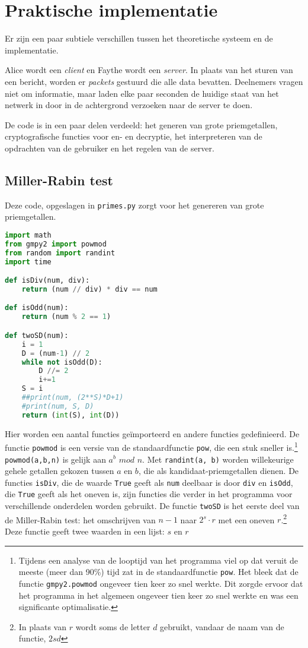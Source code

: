 \documentclass{report} %
\let\code\lstinline
\begin{document}
\section{Praktische implementatie}
Er zijn een paar subtiele verschillen tussen het theoretische systeem en de implementatie. 
\par Alice wordt een \textit{client} en Faythe wordt een \textit{server}. In plaats van het sturen van een bericht, worden er \textit{packets} gestuurd die alle data bevatten. Deelnemers vragen niet om informatie, maar laden elke paar seconden de huidige staat van het netwerk in door in de achtergrond verzoeken naar de server te doen.
\par De code is in een paar delen verdeeld: het generen van grote priemgetallen, cryptografische functies voor en- en decryptie, het interpreteren van de opdrachten van de gebruiker en het regelen van de server. 

\subsection{Miller-Rabin test}
Deze code, opgeslagen in \code{primes.py} zorgt voor het genereren van grote priemgetallen.
\begin{lstlisting}[language=Python]
import math
from gmpy2 import powmod
from random import randint
import time

def isDiv(num, div):
    return (num // div) * div == num

def isOdd(num):
    return (num % 2 == 1)

def twoSD(num):
    i = 1
    D = (num-1) // 2
    while not isOdd(D):
        D //= 2
        i+=1
    S = i
    ##print(num, (2**S)*D+1)
    #print(num, S, D)
    return (int(S), int(D))
\end{lstlisting}
Hier worden een aantal functies geïmporteerd en andere functies gedefinieerd. De functie \code{powmod} is een versie van de standaardfunctie \code{pow}, die een stuk sneller is.\footnote{Tijdens een analyse van de looptijd van het programma viel op dat veruit de meeste (meer dan 90\%) tijd zat in de standaardfunctie \code{pow}. Het bleek dat de functie \code{gmpy2.powmod} ongeveer tien keer zo snel werkte. Dit zorgde ervoor dat het programma in het algemeen ongeveer tien keer zo snel werkte en was een significante optimalisatie. } \code{powmod(a,b,n)} is gelijk aan $a^b\,\, mod\,\, n$. Met \code{randint(a, b)} worden willekeurige gehele getallen gekozen tussen $a$ en $b$, die als kandidaat-priemgetallen dienen. De functies \code{isDiv}, die de waarde \code{True} geeft als \code{num} deelbaar is door \code{div} en \code{isOdd}, die \code{True} geeft als het oneven is, zijn functies die verder in het programma voor verschillende onderdelen worden gebruikt. De functie \code{twoSD} is het eerste deel van de Miller-Rabin test: het omschrijven van $n-1$ naar $2^s\cdot r$ met een oneven $r$.\footnote{In plaats van $r$ wordt soms de letter $d$ gebruikt, vandaar de naam van de functie, $2sd$} Deze functie geeft twee waarden in een lijst: $s$ en $r$\\
\end{document}
